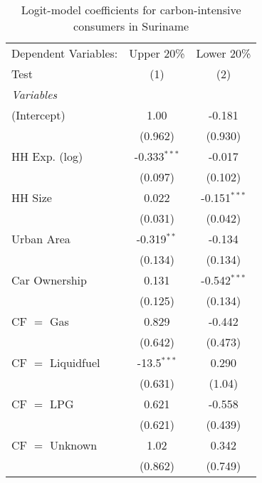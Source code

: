 
\begin{table}[htbp!]
   \centering
   \small
   \begin{adjustbox}{width = 1\textwidth, max height = 0.95\textheight, center}
      \begin{threeparttable}[b]
         \caption{\label{tab:Logit_1_SUR} Logit-model coefficients for carbon-intensive consumers in Suriname}
         \begin{tabular}{lcc}
            \tabularnewline \midrule \midrule
            Dependent Variables: & Upper 20\%     & Lower 20\%\\   
            Test                 & (1)            & (2)\\  
            \midrule
            \emph{Variables}\\
            (Intercept)          & 1.00           & -0.181\\   
                                 & (0.962)        & (0.930)\\   
            HH Exp. (log)        & -0.333$^{***}$ & -0.017\\   
                                 & (0.097)        & (0.102)\\   
            HH Size              & 0.022          & -0.151$^{***}$\\   
                                 & (0.031)        & (0.042)\\   
            Urban Area           & -0.319$^{**}$  & -0.134\\   
                                 & (0.134)        & (0.134)\\   
            Car Ownership        & 0.131          & -0.542$^{***}$\\   
                                 & (0.125)        & (0.134)\\   
            CF $=$ Gas           & 0.829          & -0.442\\   
                                 & (0.642)        & (0.473)\\   
            CF $=$ Liquidfuel    & -13.5$^{***}$  & 0.290\\   
                                 & (0.631)        & (1.04)\\   
            CF $=$ LPG           & 0.621          & -0.558\\   
                                 & (0.621)        & (0.439)\\   
            CF $=$ Unknown       & 1.02           & 0.342\\   
                                 & (0.862)        & (0.749)\\   

\end{tabular}
\end{threeparttable}
\end{adjustbox}
\end{table}
